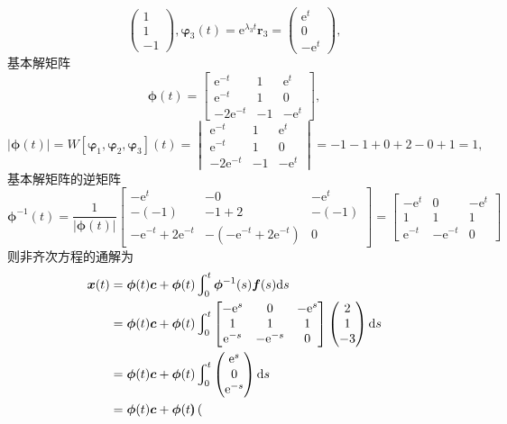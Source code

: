\documentclass[12pt,UTF8]{ctexart}
\newcommand{\Int}[4]{\varint\nolimits_{#1}^{#2}#3\mathrm d#4}
\newcommand{\me}[0]{\mathrm e}
\begin{document}
\begin{enumerate}
\[\begin{pmatrix}
1\\1\\-1
\end{pmatrix},\bm\varphi_3(t)=\me^{\lambda_3t}\bm r_3=\begin{pmatrix}
\me^t\\0\\-\me^t
\end{pmatrix},\]
基本解矩阵
\[\bm\phi(t)=\begin{bmatrix}
\me^{-t}&1&\me^t\\\me^{-t}&1&0\\-2\me^{-t}&-1&-\me^t
\end{bmatrix},\]
\[|\bm\phi(t)|=W[\bm\varphi_1,\bm\varphi_2,\bm\varphi_3](t)=\begin{vmatrix}
\me^{-t}&1&\me^t\\\me^{-t}&1&0\\-2\me^{-t}&-1&-\me^t
\end{vmatrix}=-1-1+0+2-0+1=1,\]
基本解矩阵的逆矩阵
\[
\bm\phi^{-1}(t)=\frac1{|\bm\phi(t)|}\begin{bmatrix}
-\me^t&-0&-\me^t\\
-(-1)&-1+2&-(-1)\\
-\me^{-t}+2\me^{-t}&-(-\me^{-t}+2\me^{-t})&0
\end{bmatrix}=\begin{bmatrix}
-\me^t&0&-\me^t\\
1&1&1\\
\me^{-t}&-\me^{-t}&0
\end{bmatrix}
\]
则非齐次方程的通解为
\[\begin{aligned}
\bm x(t)&=\bm\phi(t)\bm c+\bm\phi(t)\Int0t{\bm\phi^{-1}(s)\bm f(s)}s\\
&=\bm\phi(t)\bm c+\bm\phi(t)\Int0t{\begin{bmatrix}
-\me^s&0&-\me^s\\
1&1&1\\
\me^{-s}&-\me^{-s}&0
\end{bmatrix}\begin{pmatrix}
2\\1\\-3
\end{pmatrix}}s\\
&=\bm\phi(t)\bm c+\bm\phi(t)\Int0t{\begin{pmatrix}
\me^s\\0\\\me^{-s}
\end{pmatrix}}s\\
&=\bm\phi(t)\bm c+\bm\phi(t)\begin{pmatrix}

\end{pmatrix}
\end{aligned}\]
\end{enumerate}
\end{document}
